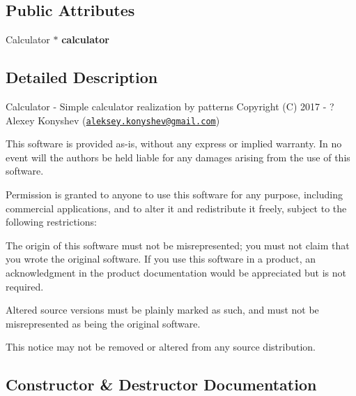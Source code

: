 \subsection*{Public Attributes}
\begin{DoxyCompactItemize}
\item 
\hypertarget{class_simple_command_parser_a89b6340ce40c9a4c444876ebdc3d0de2}{}Calculator $\ast$ {\bfseries calculator}\label{class_simple_command_parser_a89b6340ce40c9a4c444876ebdc3d0de2}

\end{DoxyCompactItemize}


\subsection{Detailed Description}
Calculator -\/ Simple calculator realization by patterns Copyright (C) 2017 -\/ ? Alexey Konyshev (\href{mailto:aleksey.konyshev@gmail.com}{\tt aleksey.\+konyshev@gmail.\+com})

This software is provided \textquotesingle{}as-\/is\textquotesingle{}, without any express or implied warranty. In no event will the authors be held liable for any damages arising from the use of this software.

Permission is granted to anyone to use this software for any purpose, including commercial applications, and to alter it and redistribute it freely, subject to the following restrictions\+:


\begin{DoxyEnumerate}
\item The origin of this software must not be misrepresented; you must not claim that you wrote the original software. If you use this software in a product, an acknowledgment in the product documentation would be appreciated but is not required.
\item Altered source versions must be plainly marked as such, and must not be misrepresented as being the original software.
\item This notice may not be removed or altered from any source distribution. 
\end{DoxyEnumerate}

\subsection{Constructor \& Destructor Documentation}
\hypertarget{class_simple_command_parser_a36f481c3b38076dd51af0b3b21dfc799}{}
